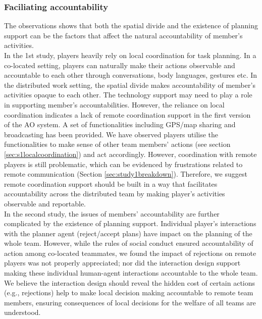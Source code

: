 \subsubsection{Faciliating accountability}\label{sec:conclusionAC}
The observations shows that both the spatial divide and the existence of planning support can be the factors that affect the natural accountability of member's activities. \\

In the 1st study, players heavily rely on local coordination for task planning. In a co-located setting, players can naturally make their actions observable and accountable to each other through conversations, body languages, gestures etc. In the distributed work setting, the spatial divide makes accountability of member's activities opaque to each other. The technology support may need to play a role in supporting member's accountabilities. However, the reliance on local coordination indicates a lack of remote coordination support in the first version of the \ac{AO} system. A set of functionalities including GPS/map sharing and broadcasting has been provided. We have observed players utilise the functionalities to make sense of other team members' actions (see section \ref{sec:s1localcoordination}) and act accordingly. However, coordination with remote players is still problematic, which can be evidenced by frustrations related to remote communication (Section \ref{sec:study1breakdown}). Therefore, we suggest remote coordination support should be built in a way that facilitates accountability across the distributed team by making player's activities observable and reportable.\\

In the second study, the issues of members' accountability are further complicated by the existence of planning support. Individual player's interactions with the planner agent (reject/accept plans) have impact on the planning of the whole team. However, while the rules of social conduct ensured accountability of action among co-located teammates, we found the impact of rejections on remote players was not properly appreciated; nor did the interaction design support making these individual human-agent interactions accountable to the whole team. We believe the interaction design should reveal the hidden cost of certain actions (e.g., rejections) help to make local decision making accountable to remote team members, ensuring consequences of local decisions for the welfare of all teams are understood. \\

